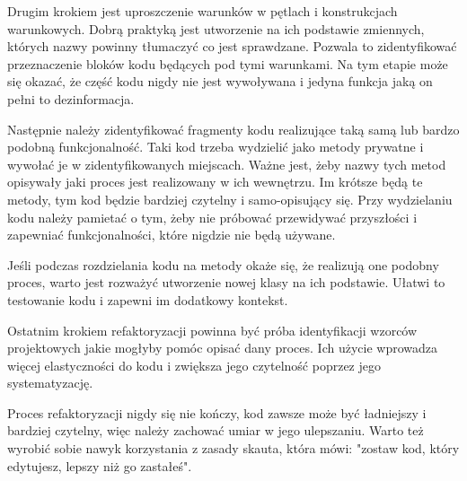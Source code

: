 Drugim krokiem jest uproszczenie warunków w pętlach i konstrukcjach warunkowych.
Dobrą praktyką jest utworzenie na ich podstawie zmiennych, których nazwy powinny tłumaczyć co jest sprawdzane.
Pozwala to zidentyfikować przeznaczenie bloków kodu będących pod tymi warunkami.
Na tym etapie może się okazać, że część kodu nigdy nie jest wywoływana i jedyna funkcja jaką on pełni to dezinformacja. 

Następnie należy zidentyfikować fragmenty kodu realizujące taką samą lub bardzo podobną funkcjonalność.
Taki kod trzeba wydzielić jako metody prywatne i wywołać je w zidentyfikowanych miejscach. 
Ważne jest, żeby nazwy tych metod opisywały jaki proces jest realizowany w ich wewnętrzu.  
Im krótsze będą te metody, tym kod będzie bardziej czytelny i samo-opisujący się. 
Przy wydzielaniu kodu należy pamietać o tym, żeby nie próbować przewidywać przyszłości i zapewniać funkcjonalności, które nigdzie nie będą używane.

Jeśli podczas rozdzielania kodu na metody okaże się, że realizują one podobny proces, warto jest rozważyć utworzenie nowej klasy na ich podstawie.
Ułatwi to testowanie kodu i zapewni im dodatkowy kontekst.

Ostatnim krokiem refaktoryzacji powinna być próba identyfikacji wzorców projektowych jakie mogłyby pomóc opisać dany proces. 
Ich użycie wprowadza więcej elastyczności do kodu i zwiększa jego czytelność poprzez jego systematyzację. 
 
Proces refaktoryzacji nigdy się nie kończy, kod zawsze może być ładniejszy i bardziej czytelny, więc należy zachować umiar w jego ulepszaniu.
Warto też wyrobić sobie nawyk korzystania z zasady skauta, która mówi: "zostaw kod, który edytujesz, lepszy niż go zastałeś".
